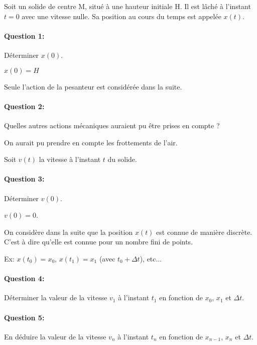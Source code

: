 




Soit un solide de centre M, situé à une hauteur initiale H. Il est lâché à l'instant $t=0$ avec une vitesse nulle. Sa position au cours du temps est appelée $x(t)$.

\paragraph{Question 1:} Déterminer $x(0)$.

$x(0)=H$

Seule l'action de la pesanteur est considérée dans la suite.

\paragraph{Question 2:} Quelles autres actions mécaniques auraient pu être prises en compte ?

On aurait pu prendre en compte les frottements de l'air.

Soit $v(t)$ la vitesse à l'instant $t$ du solide.

\paragraph{Question 3:} Déterminer $v(0)$.

$v(0)=0$.

On considère dans la suite que la position $x(t)$ est connue de manière discrète. C'est à dire qu'elle est connue pour un nombre fini de points.

Ex: $x(t_0)=x_0$, $x(t_1)=x_1$ (avec $t_0+\Delta t$), etc...

\paragraph{Question 4:} Déterminer la valeur de la vitesse $v_1$ à l'instant $t_1$ en fonction de $x_0$, $x_1$ et $\Delta t$.

\paragraph{Question 5:} En déduire la valeur de la vitesse $v_n$ à l'instant $t_n$ en fonction de $x_{n-1}$, $x_n$ et $\Delta t$.

